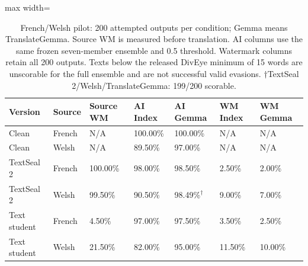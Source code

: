 \begin{table}[ht]\centering\small
\begin{adjustbox}{max width=\linewidth}
\begin{tabular}{lllllll}\toprule
Version & Source & Source WM & AI Index & AI Gemma & WM Index & WM Gemma\\\midrule
Clean & French & N/A & 100.00\% & 100.00\% & N/A & N/A\\
Clean & Welsh & N/A & 89.50\% & 97.00\% & N/A & N/A\\
TextSeal 2 & French & 100.00\% & 98.00\% & 98.50\% & 2.50\% & 2.00\%\\
TextSeal 2 & Welsh & 99.50\% & 90.50\% & 98.49\%$^{\dagger}$ & 9.00\% & 7.00\%\\
Text student & French & 4.50\% & 97.00\% & 97.50\% & 3.50\% & 2.50\%\\
Text student & Welsh & 21.50\% & 82.00\% & 95.00\% & 11.50\% & 10.00\%\\
\bottomrule\end{tabular}\end{adjustbox}
\caption{French/Welsh pilot: 200 attempted outputs per condition; Gemma means TranslateGemma. Source WM is measured before translation. AI columns use the same frozen seven-member ensemble and 0.5 threshold. Watermark columns retain all 200 outputs. Texts below the released DivEye minimum of 15 words are unscorable for the full ensemble and are not successful valid evasions. $\dagger$TextSeal 2/Welsh/TranslateGemma: 199/200 scorable.}\label{tab:translation_french_welsh}\end{table}
